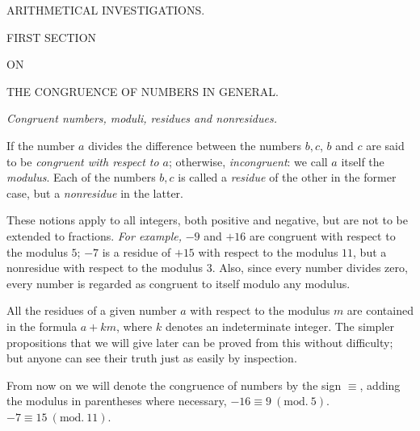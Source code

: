\begin{center}
{\Large\textsc{ARITHMETICAL INVESTIGATIONS.}}

\BookRule{\linewidth}

\textsc{FIRST SECTION}

{\scriptsize\textsc{ON}}

\textsc{THE CONGRUENCE OF NUMBERS IN GENERAL.}

\end{center}

\begin{center}
\emph{Congruent numbers, moduli, residues and nonresidues.}
\end{center}


If the number $a$ divides the difference between the numbers $b, c$, $b$ and $c$ are said to be \emph{congruent with respect to $a$}; otherwise, \emph{incongruent}: we call $a$ itself the \emph{modulus}. Each of the numbers $b, c$ is called a \emph{residue} of the other in the former case, but a \emph{nonresidue} in the latter.

These notions apply to all integers, both positive and negative, but are not to be extended to fractions. \emph{For example,} $-9$ and $+16$ are congruent with respect to the modulus $5$; $-7$ is a residue of $+15$ with respect to the modulus $11$, but a nonresidue with respect to the modulus $3$. Also, since every number divides zero, every number is regarded as congruent to itself modulo any modulus.


All the residues of a given number $a$ with respect to the modulus $m$ are contained in the formula $a+km$, where $k$ denotes an indeterminate integer. The simpler propositions that we will give later can be proved from this without difficulty; but anyone can see their truth just as easily by inspection.

From now on we will denote the congruence of numbers by the sign $\equiv$, adding the modulus in parentheses where necessary, $-16\equiv 9\ (\mathrm{mod.}\ 5)$. $-7\equiv 15\ (\mathrm{mod.}\ 11)$.

